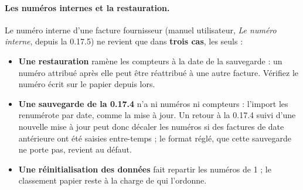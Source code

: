 \documentclass[a4paper,11pt,oneside]{article}
\begin{document}
\paragraph{Les numéros internes et la restauration.} Le numéro interne d'une facture fournisseur (manuel utilisateur, \emph{Le numéro interne}, depuis la 0.17.5) ne revient que dans \textbf{trois cas}, les seuls :
\begin{itemize}
    \item \textbf{Une restauration} ramène les compteurs à la date de la sauvegarde : un numéro attribué après elle peut être réattribué à une autre facture. Vérifiez le numéro écrit sur le papier depuis lors.
    \item \textbf{Une sauvegarde de la 0.17.4} n'a ni numéros ni compteurs : l'import les renumérote par date, comme la mise à jour. Un retour à la 0.17.4 suivi d'une nouvelle mise à jour peut donc décaler les numéros si des factures de date antérieure ont été saisies entre-temps ; le format réglé, que cette sauvegarde ne porte pas, revient au défaut.
    \item \textbf{Une réinitialisation des données} fait repartir les numéros de 1 ; le classement papier reste à la charge de qui l'ordonne.
\end{itemize}
\end{document}
